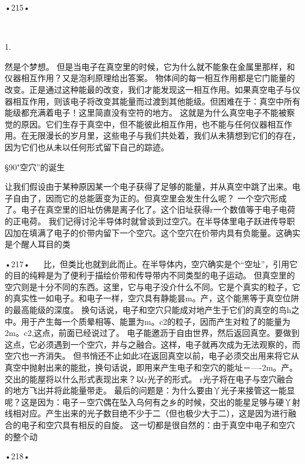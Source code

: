 •215•
  











  

1.
 
然是个梦想。
但是当电子在真空里的时候，它为什么就不能象在金属里那样，和仪器相互作用？又是泡利原理给出答案。
物体间的每一相互作用都是它门能量的改变。正是通过这种能最的改变，我们才能发现这一相互作用。如果真空电子与仪器相互作用，则该电子将改变其能量而过渡到其他能级。但困难在于：真空中所有能级都充满着电子！这里简直没有空符的地方。
这就是为什么真空电子不能被察觉的原因。它们生存于真空中，但不能彼此相互作用，也不能与任何仪器相互作用。在无限漫长的岁月里，这些电子与我们共处着，我们从未猜想到它们的存在，因为它们也从未以任何形式留下自己的踪迹。

§90"空穴”的诞生

让我们假设由于某种原因某一个电子获得了足够的能量，并从真空中跳了出来。电子自由了，因而它的总能匮变为正的。但真空里会发生什么呢？
一个空穴形成了。电子在真空里的旧址仿佛是离子化了。这个旧址获得r一个数值等于电子电荷的正电荷。
我们记得讨沦半导体时就曾谈到过空穴。在半导体里电子跃进传导职囚加在填满了电子的价带内留下一个空穴。这个空穴在价带内具有负能量。这确实是个醒人耳目的类

•217•
  
比，但类比也就到此而止。在半导体内，空穴确实是个“空址”，引用它的目的纯粹是为了便利于描绘价带和传导带内不同类型的电子运动。
但真空里的空穴则是十分不同的东西。这里，它与电子没介什么不同。它是个真实的粒子，它的真实性一如电子。和电子一样，空穴具有静能昙m。产，这个能黑等于真空位阱的最高能级的深度。
换句话说，电子和空穴只能成对地产生于它们的真空的鸟h之中。用于产生每一个质晕相等、能噩为m。c2的粒子，因而产生对粒了的能量为2m。c2,这点，前面已经说过了。
电子能邀沥于自由世界，然后返回真空。要做到这点，它必须遇到一个空穴，并与之融合。这样，电子就再次成为无法观察的，而空穴也一齐消失。
但书悄还不止如此3在返回真空以前，电子必须交出用来将它从真空中抛射出来的能批，换句话说，即用来产生电子和空穴的能址－—-2m。产。
交出的能屋将以什么形式表现出来？以r光子的形式。
r光子将在电子与空穴融合的地方飞出并将此能量带走。
最后的问题是：为什么要由丫光子来接管这一能显呢？这是因为：电子－空穴偶在坠入乌何有之乡的时候，交出的能星足够与硬丫射线相对应。产生出来的光子数目绝不少于二（但也极少大于二），这是因为进行融合的电子和空穴具有相反的自旋。
这一切都是很自然的：由于真空中电子和空穴的整个动

•218•
  







